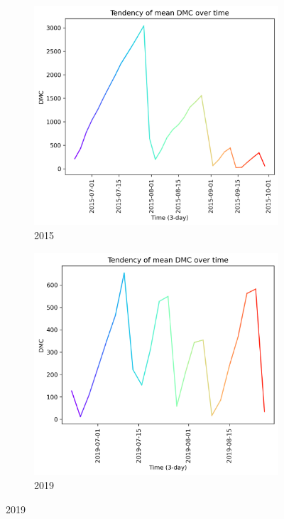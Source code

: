 \begin{figure}[h]
	\caption{DMC mean tendency graph}
	\centering
	\begin{subfigure}{0.49\textwidth}
		\centering
		\includegraphics[width=\textwidth]{graphs/all_time/2015_tendency_graph_DMC.png}
		\caption{2015}
		\label{fig:mean_tendency_dmc_2015}
	\end{subfigure}
	\hfill
	\begin{subfigure}{0.49\textwidth}
		\centering
		\includegraphics[width=\textwidth]{graphs/all_time/2019_tendency_graph_DMC.png}
		\caption{2019}
		\label{fig:mean_tendency_dmc_2019}
	\end{subfigure}
	\label{fig:mean_tendency_dmc}
\end{figure}

